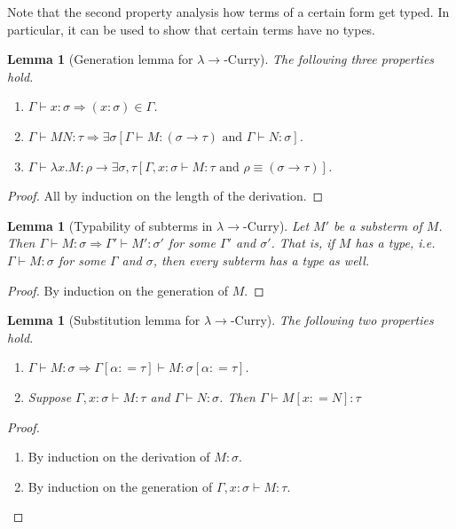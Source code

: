 \documentclass{llncs}
\newcommand{\lambdasystem}[0]{{\lambda}{\rightarrow}}
\theoremstyle{definition}
\numberwithin{mydef}{subsection}
\theoremstyle{plain}
\newtheorem{mylm}[mydef]{Lemma}
\theoremstyle{remark}
\begin{document}
	Note that the second property analysis how terms of a certain form get typed.
	In particular, it can be used to show that certain terms have no types.
	
	\begin{mylm}[Generation lemma for $\lambdasystem$-Curry]\label{lm:generation-curry}
		The following three properties hold.
		\begin{enumerate}
			\item $\Gamma \vdash x : \sigma \Rightarrow \left( x : \sigma \right) \in \Gamma$.
			\item $\Gamma \vdash M N : \tau \Rightarrow \exists \sigma \left[ \Gamma \vdash M : \left( \sigma \rightarrow \tau \right) \text{ and } \Gamma \vdash N : \sigma \right]$.
			\item $\Gamma \vdash \lambda x . M : \rho \rightarrow \exists \sigma, \tau [\Gamma , x : \sigma \vdash M : \tau \text{ and } \rho \equiv \left( \sigma \rightarrow \tau \right)]$.
		\end{enumerate}
	\end{mylm}
	\begin{proof}
		All by induction on the length of the derivation.
	\end{proof}
	
	\begin{mylm}[Typability of subterms in $\lambdasystem$-Curry]
		Let $M '$ be a substerm of $M$. Then $\Gamma \vdash M : \sigma \Rightarrow \Gamma ' \vdash M ' : \sigma '$ for some $\Gamma '$ and $\sigma '$.
		That is, if $M$ has a type, i.e. $\Gamma \vdash M : \sigma$ for some $\Gamma$ and $\sigma$, then every subterm has a type as well.
	\end{mylm}
	\begin{proof}
		By induction on the generation of $M$.
	\end{proof}
	
	\begin{mylm}[Substitution lemma for $\lambdasystem$-Curry]\label{lm:substitution-curry}
		The following two properties hold.
		\begin{enumerate}
			\item $\Gamma \vdash M : \sigma \Rightarrow \Gamma {\left[ \alpha : = \tau \right]} \vdash M : \sigma {\left[ \alpha : = \tau \right]}$.
			\item Suppose $\Gamma, x : \sigma \vdash M : \tau$ and $\Gamma \vdash N : \sigma$. Then $\Gamma \vdash M {\left[ x : = N \right]} : \tau$
		\end{enumerate}
	\end{mylm}
	\begin{proof}
		\begin{enumerate}
			\item By induction on the derivation of $M : \sigma$.
			\item By induction on the generation of $\Gamma , x : \sigma \vdash M : \tau$.
		\end{enumerate}
	\end{proof}
	
\end{document}
